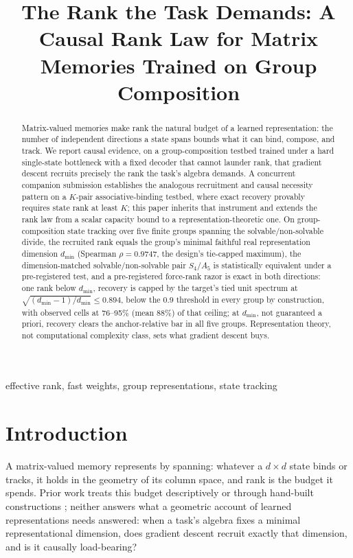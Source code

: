 \documentclass[mlabstract,onecolumn]{jmlr}
\title[A Causal Rank Law for Matrix Memories]{The Rank the Task Demands:
A Causal Rank Law for Matrix Memories Trained on Group Composition}
\newcommand{\dmin}{d_{\min}}
\begin{document}
\maketitle

\begin{abstract}
Matrix-valued memories make rank the natural budget of a learned
representation: the number of independent directions a state spans bounds
what it can bind, compose, and track. We report causal evidence, on a
group-composition testbed trained under a hard single-state bottleneck
with a fixed decoder that cannot launder rank, that gradient descent
recruits precisely the rank the task's algebra demands. A concurrent
companion submission establishes the analogous recruitment and causal
necessity pattern on a $K$-pair associative-binding testbed, where exact
recovery provably requires state rank at least $K$; this paper inherits
that instrument and extends the rank law from a scalar capacity bound to
a representation-theoretic one.
On
group-composition state tracking over five finite groups spanning the
solvable/non-solvable divide, the recruited rank equals the group's minimal
faithful real representation dimension $\dmin$ (Spearman $\rho = 0.9747$,
the design's tie-capped maximum),
the dimension-matched solvable/non-solvable
pair $S_4$/$A_5$ is statistically equivalent under a pre-registered
test,
and a pre-registered force-rank razor is exact in both
directions: one rank below $\dmin$, recovery is capped by the target's
tied unit spectrum at $\sqrt{(\dmin{-}1)/\dmin} \le 0.894$, below the
$0.9$ threshold in every group by construction, with observed cells
at 76--95\% (mean 88\%) of that ceiling;
at $\dmin$, not
guaranteed a priori, recovery clears the
anchor-relative bar in all five groups.
Representation theory, not
computational complexity class, sets what gradient descent buys.
\end{abstract}

\begin{keywords}
effective rank, fast weights, group representations, state tracking
\end{keywords}

\section{Introduction}
\label{sec:intro}

A matrix-valued memory represents by spanning: whatever a $d \times d$
state binds or tracks, it holds in the geometry of its column space, and
rank is the budget it spends. Prior work treats this budget
descriptively \citep{nazari2026rank, sun2026staterank} or through
hand-built constructions \citep{nichani2025factual}; neither answers
what a geometric account of learned representations needs answered:
when a task's algebra fixes a minimal representational dimension, does
gradient descent recruit exactly that dimension, and is it causally
load-bearing?
\end{document}
